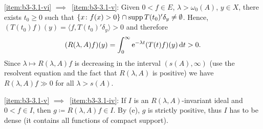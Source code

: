 \ref{item:b3-3.1-vi} $\implies$~\ref{item:b3-3.1-v}: Given $0 < f \in E$, $\lambda > \omega_{0}(A)$, $y \in X$, there exists $t_{0} \geq 0$ such that 
$\{x \colon f(x) > 0\} \cap \mathop{}\!\mathrm{supp}\, T(t_{0})'\delta_{y} \neq \emptyset$.
Hence, $(T(t_{0})f)(y) = \langle f,T(t_{0})'\delta_{y} \rangle > 0$ and therefore
\[
(R(\lambda,A)f)(y) = \int_{0}^{\infty} \mathrm{e}^{-\lambda t}(T(t)f)(y) \mathop{}\!\mathrm{d}{t} > 0 .
\]
Since $\lambda \mapsto R(\lambda,A)f$ is decreasing in the interval $(s(A),\infty)$ (use the resolvent equation and the fact that $R(\lambda,A)$ is positive) we have $R(\lambda,A)f \gg 0$ for all $\lambda > s(A)$.

\ref{item:b3-3.1-v} $\implies$~\ref{item:b3-3.1-iv}: If\/ $I$ is an $R(\lambda,A)$-invariant ideal and $0 < f \in I$, then $g \coloneq R(\lambda,A)f \in I$. 
By (e), $g$ is strictly positive, thus $I$ has to be dense (it contains all functions of compact support). 

